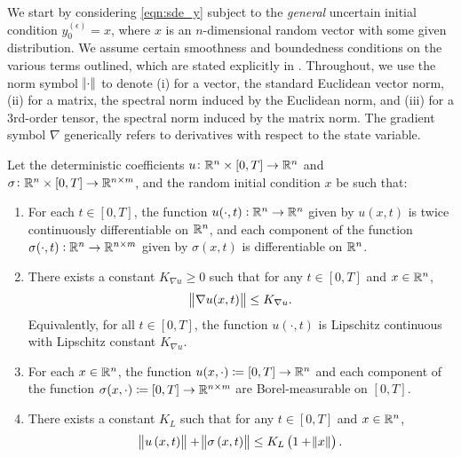 We start by considering \eqref{eqn:sde_y} subject to the \emph{general} uncertain initial condition \(y_0^{(\epsilon)} = x\), where \(x\) is an \(n\)-dimensional random vector with some given distribution.
We assume certain smoothness and boundedness conditions on the various terms outlined, which are stated explicitly in .
Throughout, we use the norm symbol \(\norm{\cdot}\) to denote (i) for a vector, the standard Euclidean vector norm, (ii) for a matrix, the spectral norm induced by the Euclidean norm, and (iii) for a 3rd-order tensor, the spectral norm induced by the matrix norm.
The gradient symbol \(\nabla\) generically refers to derivatives with respect to the state variable.

\renewcommand\thehypo{H}
\begin{hypo}\label{hyp:smooth}
	Let the deterministic coefficients \(u \colon \mathbb{R}^n\times [0,T] \to \mathbb{R}^n\) and \(\sigma \colon \mathbb{R}^n \times [0,T] \to \mathbb{R}^{n\times m}\), and the random initial condition \(x\) be such that:
	\begin{enumerate}[label=(H.\arabic{*}), ref=H.\arabic{*}]
		\item\label{hyp:coef_cont} For each \(t \in [0,T]\), the function \(u(\cdot, t): \mathbb{R}^n \to \mathbb{R}^n\) given by \(u(x,t)\) is twice continuously differentiable on \(\mathbb{R}^n\), and each component of the function \(\sigma(\cdot, t): \mathbb{R}^n \to \mathbb{R}^{n\times m}\) given by \(\sigma(x,t)\) is differentiable on \(\mathbb{R}^n\).

		\item\label{hyp:u_bounds} There exists a constant \(K_{\nabla u} \geq 0\) such that for any \(t \in [0,T]\) and \(x \in \mathbb{R}^n\),
		\begin{equation*}
			\norm{\nabla u(x,t)} \leq K_{\nabla u}.
		\end{equation*}
		Equivalently, for all \(t \in [0,T]\), the function \(u\!\left(\cdot, t\right)\) is Lipschitz continuous with Lipschitz constant \(K_{\nabla u}\).

		\item\label{hyp:coef_meas} For each \(x \in \mathbb{R}^n\), the function \(u(x,\cdot) \coloneqq [0,T] \to \mathbb{R}^n\) and each component of the function \(\sigma(x,\cdot) \coloneqq [0,T] \to \mathbb{R}^{n\times m}\) are Borel-measurable on \([0,T]\).

		\item\label{hyp:linear_growth} There exists a constant \(K_L\) such that for any \(t \in [0,T]\) and \(x \in \mathbb{R}^n\),
		\[
			\norm{u\left(x,t\right)} + \norm{\sigma\left(x,t\right)} \leq K_L\left(1 + \norm{x}\right).
		\]


\end{enumerate}
\end{hypo}
